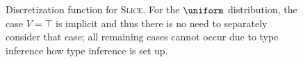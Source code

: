 \begin{figure}[t]
    \caption{Discretization function for \textsc{Slice}. For the $\uniform$ distribution, the case $V = \top$ is implicit and thus there is no need to separately consider that case; all remaining cases cannot occur due to type inference how type inference is set up.}
    \label{fig:discretization-code}
\end{figure}
